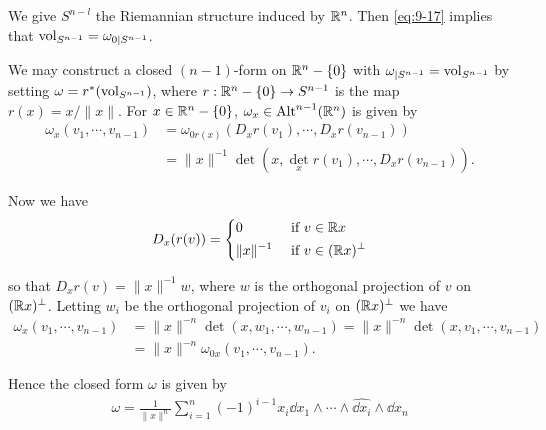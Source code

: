 We give $S^{n-l}$ the Riemannian structure induced by $\mathbb{R}^n$. Then \eqref{eq:9-17} implies that
$\mathrm{vol}_{S^{n-1}} = \omega_{0|S^{n-1}}$.

We may construct a closed $(n-1)$-form on $\mathbb{R}^n-\{0\}$ with $\omega_{|S^{n-1}} = \mathrm{vol}_{S^{n-1}}$
by setting $\omega = r^*(\mathrm{vol}_{S^{n-1}})$, where $r:\mathbb{R}^n-\{0\}\to S^{n-1}$ is the map $r(x) = x/\|x\|$.
For $x\in\mathbb{R}^n-\{0\}$, $\omega_x\in\operatorname{Alt}^{n-1}(\mathbb{R}^n)$ is given by 
\begin{align*}
    \omega_x(v_1, \cdots, v_{n-1}) 
      & = \omega_{0r(x)}(D_xr(v_1), \cdots, D_xr(v_{n-1})) \\
      & = \|x\|^{-1}\det (x, \det_xr(v_1), \cdots, D_xr(v_{n-1})).
\end{align*}

Now we have 
\begin{align*}
  D_x(r(v)) = \left\{\begin{aligned}
    & 0         && \text{ if } v\in \mathbb{R} x \\
    & \|x\|^{-1}&& \text{ if } v\in (\mathbb{R} x)^{\perp} 
  \end{aligned}\right.
\end{align*}

so that $D_xr(v) = \|x\|^{-1}w$, where $w$ is the orthogonal projection of $v$ on $(\mathbb{R} x)^\perp$.
Letting $w_i$ be the orthogonal projection of $v_i$ on $(\mathbb{R} x)^\perp$ we have
\begin{align*}
  \omega_x (v_1, \cdots, v_{n-1})
  & = \|x\|^{-n} \det (x, w_1, \cdots, w_{n-1}) 
    = \|x\|^{-n} \det (x, v_1, \cdots, v_{n-1}) \\
  & = \|x\|^{-n} \omega_{0x}(v_1, \cdots, v_{n-1}).
\end{align*}

Hence the closed form $\omega$ is given by 
\begin{align}
  \omega = \frac{1}{\|x\|^n} \sum_{i=1}^{n }{
    (-1)^{i-1}x_i \dd x_1\wedge\cdots\wedge\widehat{\dd x_i}\wedge\dd x_n
  }
\end{align}

